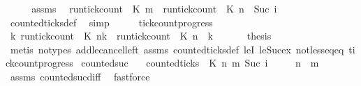\begin{isabellebody}
%
\isadelimproof
%
\endisadelimproof
%
\isatagproof
{}\isamarkupfalse%
\ {\isacharminus}\isanewline
\ \ \isamarkupfalse%
\ assms\ \isamarkupfalse%
\ {\isacartoucheopen}run{\isacharunderscore}tick{\isacharunderscore}count\ {\isasymrho}\ K\ m\ {\isacharequal}\ run{\isacharunderscore}tick{\isacharunderscore}count\ {\isasymrho}\ K\ n\ {\isacharplus}\ {\isacharparenleft}Suc\ i{\isacharparenright}{\isacartoucheclose}\isanewline
\ \ \ \ \isamarkupfalse%
\ counted{\isacharunderscore}ticks{\isacharunderscore}def\ \isamarkupfalse%
\ simp\isanewline
\ \ \isamarkupfalse%
\ \isamarkupfalse%
\ tick{\isacharunderscore}count{\isacharunderscore}progress\ \isamarkupfalse%
\ {\isacartoucheopen}{\isasymforall}k{\isachardot}\ run{\isacharunderscore}tick{\isacharunderscore}count\ {\isasymrho}\ K\ {\isacharparenleft}n{\isacharplus}k{\isacharparenright}\ {\isasymle}\ {\isacharparenleft}run{\isacharunderscore}tick{\isacharunderscore}count\ {\isasymrho}\ K\ n{\isacharparenright}\ {\isacharplus}\ k{\isacartoucheclose}\ \isacommand{{\isachardot}{\isachardot}}\isamarkupfalse%
\isanewline
\ \ \isamarkupfalse%
\ \isamarkupfalse%
\ {\isacharquery}thesis\ \isanewline
\ \ \ \ \ \ \isamarkupfalse%
\ {\isacharparenleft}metis\ {\isacharparenleft}no{\isacharunderscore}types{\isacharparenright}\ add{\isacharunderscore}le{\isacharunderscore}cancel{\isacharunderscore}left\ assms\ counted{\isacharunderscore}ticks{\isacharunderscore}def\ leI\ le{\isacharunderscore}Suc{\isacharunderscore}ex\ not{\isacharunderscore}less{\isacharunderscore}eq{\isacharunderscore}eq\ tick{\isacharunderscore}count{\isacharunderscore}progress{\isacharparenright}\isanewline
{}\isamarkupfalse%
%
\endisatagproof
{\isafoldproof}%
%
\isadelimproof
\isanewline
%
\endisadelimproof
\isanewline
{}\isamarkupfalse%
\ counted{\isacharunderscore}suc{\isacharcolon}\isanewline
\ \ \ {\isacartoucheopen}counted{\isacharunderscore}ticks\ {\isasymrho}\ K\ n\ m\ {\isacharparenleft}Suc\ i{\isacharparenright}{\isacartoucheclose}\isanewline
\ \ \ \ \ {\isacartoucheopen}n\ {\isacharless}\ m{\isacartoucheclose}\isanewline
%
\isadelimproof
%
\endisadelimproof
%
\isatagproof
{}\isamarkupfalse%
\ assms\ counted{\isacharunderscore}suc{\isacharunderscore}diff\ \isamarkupfalse%
\ fastforce%
\endisatagproof
{\isafoldproof}%
%
\isadelimproof
\isanewline
%
\endisadelimproof

\end{isabellebody}
